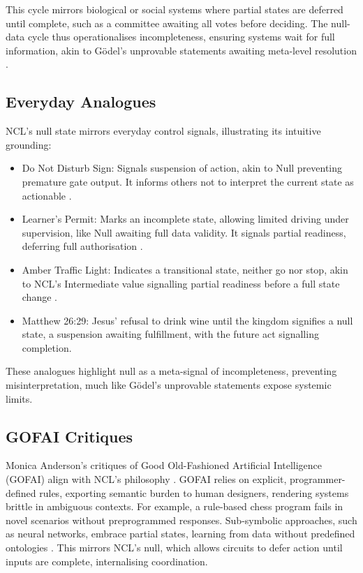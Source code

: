 \documentclass{article}
\begin{document}
This cycle mirrors biological or social systems where partial states are deferred until complete, such as a committee awaiting all votes before deciding. The null-data cycle thus operationalises incompleteness, ensuring systems wait for full information, akin to G\"{o}del's unprovable statements awaiting meta-level resolution \citep{nagel1958}.

\subsection{Everyday Analogues}
NCL's null state mirrors everyday control signals, illustrating its intuitive grounding:

\begin{itemize}
    \item Do Not Disturb Sign: Signals suspension of action, akin to Null preventing premature gate output. It informs others not to interpret the current state as actionable \citep{fant2005}.
    \item Learner's Permit: Marks an incomplete state, allowing limited driving under supervision, like Null awaiting full data validity. It signals partial readiness, deferring full authorisation \citep{fant2005}.
    \item Amber Traffic Light: Indicates a transitional state, neither go nor stop, akin to NCL's Intermediate value signalling partial readiness before a full state change \citep{fant2005}.
    \item Matthew 26:29: Jesus' refusal to drink wine until the kingdom signifies a null state, a suspension awaiting fulfillment, with the future act signalling completion.
\end{itemize}

These analogues highlight null as a meta-signal of incompleteness, preventing misinterpretation, much like G\"{o}del's unprovable statements expose systemic limits.

\subsection{GOFAI Critiques}
Monica Anderson's critiques of Good Old-Fashioned Artificial Intelligence (GOFAI) align with NCL's philosophy \citep{anderson2006}. GOFAI relies on explicit, programmer-defined rules, exporting semantic burden to human designers, rendering systems brittle in ambiguous contexts. For example, a rule-based chess program fails in novel scenarios without preprogrammed responses. Sub-symbolic approaches, such as neural networks, embrace partial states, learning from data without predefined ontologies \citep{clark2013, hohwy2013}. This mirrors NCL's null, which allows circuits to defer action until inputs are complete, internalising coordination.
\end{document}
